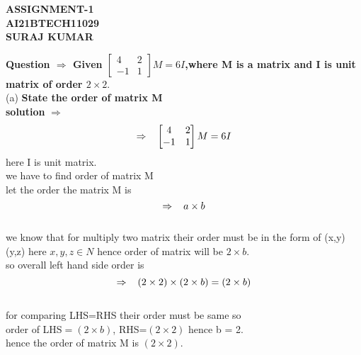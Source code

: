 \documentclass[10pt]{article}
\begin{document}
\huge \centering \textbf{ASSIGNMENT-1}\\
\Large \centering \textbf{AI21BTECH11029}\\
\Large \centering \textbf{SURAJ KUMAR}\\
\begin{multicols}{2}
\begin{flushleft}
\textbf{Question $\Rightarrow$ Given $\begin{bmatrix}
     4 & 2 \\
     -1 & 1 
      \end{bmatrix}M=6I$,where M is a matrix and I is unit matrix of order $2\times 2.$}\\
(a)  \textbf{State the order of matrix M}\\
 \textbf{solution} $\Rightarrow$ $$\Rightarrow \hspace{3mm} \begin{bmatrix}
     4 & 2 \\
     -1 & 1 
      \end{bmatrix}M=6I$$  
    here I is unit matrix.\\
    we have to find order of matrix M\\
    let the order the matrix M is  $$ \Rightarrow \hspace{3mm} a\times b$$\\
      
      we know that for multiply two matrix their order must be in the form of  (x,y) (y,z)  here $x,y,z \in N$
      hence order of matrix will be $2\times b$.\\
      so overall left hand side order is  $$\Rightarrow \hspace{3mm} (2\times 2)\times(2\times b) =(2\times b)$$\\
      for comparing LHS=RHS their order must be same so \\
      order of LHS$=(2\times b)$,
      RHS=$(2\times 2)$  hence b = 2.\\
      hence the order of matrix M is $(2\times 2).$\\
      \vspace{1cm}


\end{flushleft}
\end{multicols}
\end{document}
